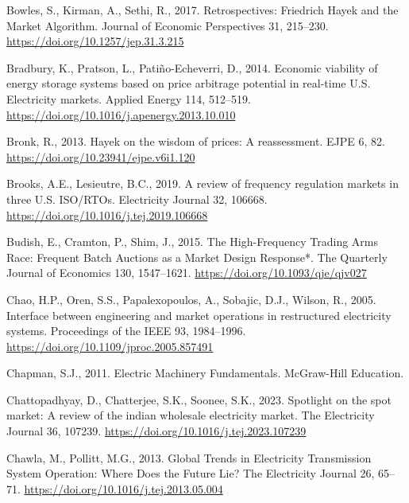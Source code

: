 \documentclass[12pt,a4paper,]{report}
\newlength{\cslhangindent}
\newenvironment{CSLReferences}[2] %
 {%
  \setlength{\parindent}{0pt}
  \ifodd #1 \everypar{\setlength{\hangindent}{\cslhangindent}}\ignorespaces\fi
  \ifnum #2 > 0
  \setlength{\parskip}{#2\baselineskip}
  \fi
 }%
 {}
\begin{document}
\begin{CSLReferences}{1}{0}
\leavevmode{}%
Bowles, S., Kirman, A., Sethi, R., 2017. Retrospectives: {Friedrich
Hayek} and the {Market Algorithm}. Journal of Economic Perspectives 31,
215--230. \url{https://doi.org/10.1257/jep.31.3.215}

\leavevmode{}%
Bradbury, K., Pratson, L., Patiño-Echeverri, D., 2014. Economic
viability of energy storage systems based on price arbitrage potential
in real-time {U}.{S}. Electricity markets. Applied Energy 114, 512--519.
\url{https://doi.org/10.1016/j.apenergy.2013.10.010}

\leavevmode{}%
Bronk, R., 2013. Hayek on the wisdom of prices: A reassessment. EJPE 6,
82. \url{https://doi.org/10.23941/ejpe.v6i1.120}

\leavevmode{}%
Brooks, A.E., Lesieutre, B.C., 2019. A review of frequency regulation
markets in three {U}.{S}. {ISO}/{RTOs}. Electricity Journal 32, 106668.
\url{https://doi.org/10.1016/j.tej.2019.106668}

\leavevmode{}%
Budish, E., Cramton, P., Shim, J., 2015. The {High-Frequency Trading
Arms Race}: {Frequent Batch Auctions} as a {Market Design Response}*.
The Quarterly Journal of Economics 130, 1547--1621.
\url{https://doi.org/10.1093/qje/qjv027}

\leavevmode{}%
Chao, H.P., Oren, S.S., Papalexopoulos, A., Sobajic, D.J., Wilson, R.,
2005. Interface between engineering and market operations in
restructured electricity systems. Proceedings of the IEEE 93,
1984--1996. \url{https://doi.org/10.1109/jproc.2005.857491}

\leavevmode{}%
Chapman, S.J., 2011. Electric {Machinery Fundamentals}. McGraw-Hill
Education.

\leavevmode{}%
Chattopadhyay, D., Chatterjee, S.K., Soonee, S.K., 2023. Spotlight on
the spot market: {A} review of the indian wholesale electricity market.
The Electricity Journal 36, 107239.
\url{https://doi.org/10.1016/j.tej.2023.107239}

\leavevmode{}%
Chawla, M., Pollitt, M.G., 2013. Global {Trends} in {Electricity
Transmission System Operation}: {Where Does} the {Future Lie}? The
Electricity Journal 26, 65--71.
\url{https://doi.org/10.1016/j.tej.2013.05.004}


\end{CSLReferences}
\end{document}

